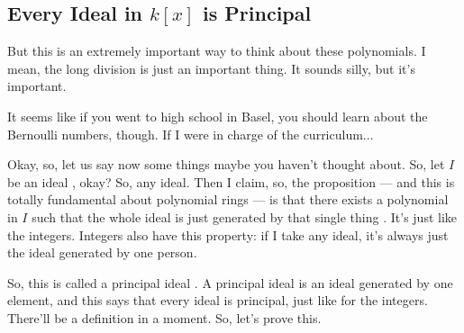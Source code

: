 \subsection{Every Ideal in \texorpdfstring{$k[x]$}{k[x]} is Principal}

\begin{speech}[00:32:21 - 00:34:09]
But this is an extremely important way to think about these polynomials. I mean, the long division is just an important thing. It sounds silly, but it's important.

It seems like if you went to high school in Basel, you should learn about the Bernoulli numbers, though. If I were in charge of the curriculum... 

Okay, so, let us say now some things maybe you haven't thought about. So, let $I$ be an ideal , okay? So, any ideal. Then I claim, so, the proposition --- and this is totally fundamental about polynomial rings --- is that there exists a polynomial in $I$  such that the whole ideal is just generated by that single thing . It's just like the integers. Integers also have this property: if I take any ideal, it's always just the ideal generated by one person.

So, this is called a principal ideal . A principal ideal is an ideal generated by one element, and this says that every ideal is principal, just like for the integers. There'll be a definition in a moment. So, let's prove this.
\end{speech}

\begin{content}
\end{content}

